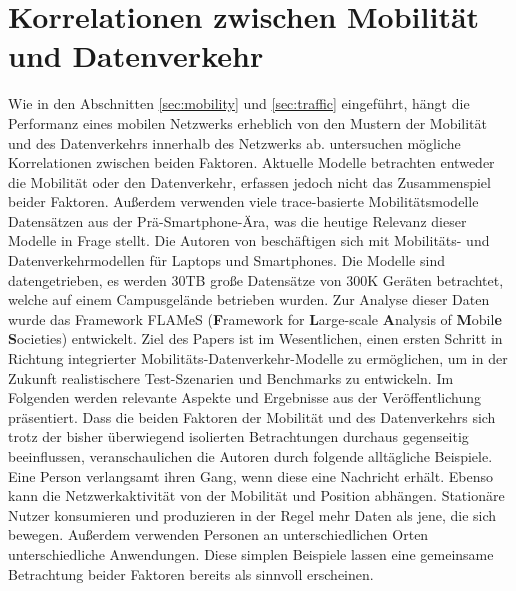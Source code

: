 \documentclass[12pt, a4paper]{article}
\begin{document}
\vfill

\pagebreak

\section{Korrelationen zwischen Mobilität und Datenverkehr}

Wie in den Abschnitten \ref{sec:mobility} und \ref{sec:traffic} eingeführt, hängt die Performanz eines mobilen
Netzwerks erheblich von den Mustern der Mobilität und des Datenverkehrs innerhalb des Netzwerks ab.
\cite{Alipour2018} untersuchen mögliche Korrelationen zwischen beiden Faktoren.
\newline\newline
Aktuelle Modelle betrachten entweder die Mobilität oder den Datenverkehr, erfassen jedoch nicht das Zusammenspiel beider Faktoren.
Außerdem verwenden viele trace-basierte Mobilitätsmodelle Datensätzen aus der Prä-Smartphone-Ära,
was die heutige Relevanz dieser Modelle in Frage stellt. \cite{Alipour2018}\newline
Die Autoren von \cite{Alipour2018} beschäftigen sich mit Mobilitäts- und Datenverkehrmodellen für Laptops und Smartphones.
Die Modelle sind datengetrieben, es werden $30$\textsc{TB} große Datensätze von $300$\textsc{K} Geräten betrachtet, welche auf einem Campusgelände
betrieben wurden. Zur Analyse dieser Daten wurde das Framework FLAMeS (\textbf{F}ramework for \textbf{L}arge-scale \textbf{A}nalysis of \textbf{M}obil\textbf{e} \textbf{S}ocieties) entwickelt.
Ziel des Papers ist im Wesentlichen, einen ersten Schritt in Richtung integrierter Mobilitäts-Datenverkehr-Modelle 
zu ermöglichen, um in der Zukunft realistischere Test-Szenarien und Benchmarks zu entwickeln. Im Folgenden werden relevante
Aspekte und Ergebnisse aus der Veröffentlichung präsentiert.\newline\newline
Dass die beiden Faktoren der Mobilität und des Datenverkehrs sich trotz der bisher überwiegend isolierten Betrachtungen
durchaus gegenseitig beeinflussen, veranschaulichen die Autoren durch folgende alltägliche Beispiele. 
Eine Person verlangsamt ihren Gang, wenn diese eine Nachricht erhält. Ebenso kann die Netzwerkaktivität von der
Mobilität und Position abhängen. Stationäre Nutzer konsumieren und produzieren in der Regel mehr Daten als jene, 
die sich bewegen. Außerdem verwenden Personen an unterschiedlichen Orten unterschiedliche Anwendungen.
Diese simplen Beispiele lassen eine gemeinsame Betrachtung beider Faktoren bereits als sinnvoll erscheinen.
\end{document}
